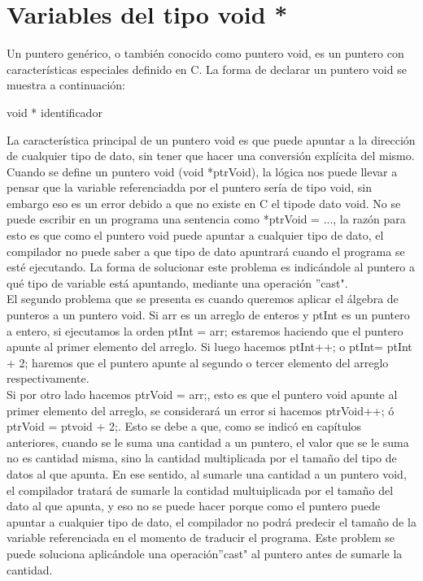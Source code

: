 \documentclass[12pt ]{article}
\begin{document}
\section{Variables del tipo void *}
Un puntero genérico, o también conocido como puntero void, es un puntero con características especiales definido en C.
La forma de declarar un puntero void se muestra a continuación:
\begin{center}
        void * identificador
\end{center}
La característica principal de un puntero void es que puede apuntar a la dirección de cualquier tipo de dato, sin tener que hacer una conversión explícita del mismo.\\
Cuando se define un puntero void (void *ptrVoid), la lógica nos puede llevar a pensar que la variable referenciadda por el puntero sería de tipo void, sin embargo eso es un error debido a que no existe en C el tipode dato void. No se puede escribir en un programa una sentencia como *ptrVoid = ..., la razón para esto es que como el puntero void puede apuntar a cualquier tipo de dato, el compilador no puede saber a que tipo de dato apuntrará cuando el programa se esté ejecutando. La forma de solucionar este problema es indicándole al puntero a qué tipo de variable está apuntando, mediante una operación ''cast".\\
El segundo problema que se presenta es cuando queremos aplicar el álgebra de punteros a un puntero void. Si arr es un arreglo de enteros y ptInt es un puntero a entero, si ejecutamos la orden ptInt = arr; estaremos haciendo que el puntero apunte al primer elemento del arreglo. Si luego hacemos ptInt++; o ptInt= ptInt + 2; haremos que el puntero apunte al segundo o tercer elemento del arreglo respectivamente.\\

Si por otro lado hacemos ptrVoid = arr;, esto es que el puntero void apunte al primer elemento del arreglo, se considerará un error si hacemos ptrVoid++; ó ptrVoid = ptvoid + 2;. Esto se debe a que, como se indicó en capítulos anteriores, cuando se le suma una cantidad a un puntero, el valor que se le suma no es cantidad misma, sino la cantidad multiplicada por el tamaño del tipo de datos al que apunta. En ese sentido, al sumarle una cantidad a un puntero void, el compilador tratará de sumarle la contidad multuiplicada por el tamaño del dato al que apunta, y eso no se puede hacer porque como el puntero puede apuntar a cualquier tipo de dato, el compilador no podrá predecir el tamaño de la variable referenciada en el momento de traducir el programa. Este problem se puede soluciona aplicándole una operación''cast" al puntero antes de sumarle la cantidad.\\
\end{document}
